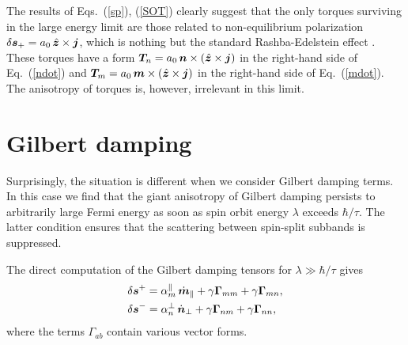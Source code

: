 The results of Eqs.~(\ref{sp}), (\ref{SOT}) clearly suggest that the only torques surviving in the large energy limit are those related to non-equilibrium polarization $\delta\boldsymbol{s}_+=a_0 \,\hat{\boldsymbol{z}}\times\boldsymbol{j}$, which is nothing but the standard Rashba-Edelstein effect \cite{Edelstein1990}. These torques have a form $\boldsymbol{T}_n= a_0 \,\boldsymbol{n}\times(\hat{\boldsymbol{z}}\times\boldsymbol{j})$ in the right-hand side of Eq.~(\ref{ndot}) and $\boldsymbol{T}_m= a_0 \,\boldsymbol{m}\times(\hat{\boldsymbol{z}}\times\boldsymbol{j})$ in the right-hand side of Eq.~(\ref{mdot}). The anisotropy of torques is, however, irrelevant in this limit.  

\section{Gilbert damping}\label{sec:gd}

Surprisingly, the situation is different when we consider Gilbert damping terms. In this case we find that the giant anisotropy of Gilbert damping persists to arbitrarily large Fermi energy as soon as spin orbit energy $\lambda$ exceeds $\hbar/\tau$. The latter condition ensures that the scattering between spin-split subbands is suppressed. 

The direct computation of the Gilbert damping tensors for $\lambda\gg \hbar/\tau$ gives
\beml
\label{gilbert}
\begin{align}
&\delta\boldsymbol{s}^+= \alpha_m^\parallel\,\dot{\boldsymbol{m}}_\parallel + \gamma \boldsymbol{\Gamma}_{mm}+ \gamma\boldsymbol{\Gamma}_{mn},\\
&\delta\boldsymbol{s}^-= \alpha_n^\perp\,\dot{\boldsymbol{n}}_\perp +\gamma \boldsymbol{\Gamma}_{nm}+\gamma \boldsymbol{\Gamma}_{nn},
\end{align}
\eml
where the terms $\Gamma_{ab}$ contain various vector forms. 

